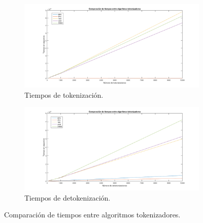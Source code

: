 \begin{figure}
  \centering
  \begin{subfigure}{1\textwidth}
    \begin{center}
      \includegraphics[width=1\linewidth]{diagramas/tok_todos}
      \caption{Tiempos de tokenización.}
    \end{center}
  \end{subfigure}
  \begin{subfigure}{0.9\textwidth}
    \begin{center}
      \includegraphics[width=1\linewidth]{diagramas/detok_todos}
      \caption{Tiempos de detokenización.}
    \end{center}
  \end{subfigure}
  \caption{Comparación de tiempos entre algoritmos tokenizadores.}
  \label{figura:tok_todos}
\end{figure}

